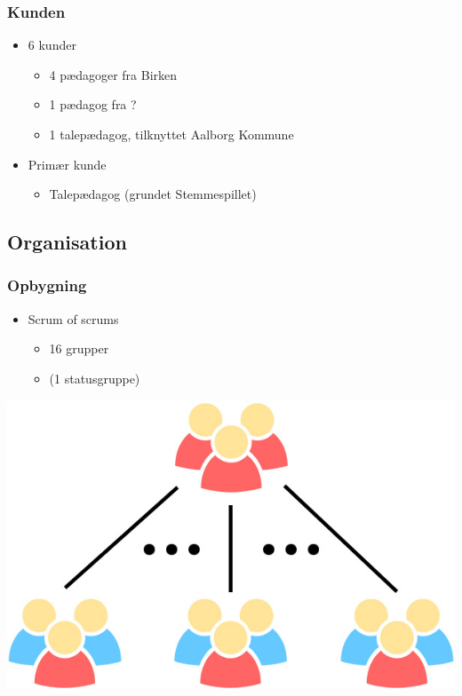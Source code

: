 \begin{frame}
\frametitle{Kunden}

\begin{itemize}
\item 6 kunder
\begin{itemize}
\item 4 pædagoger fra Birken
\item 1 pædagog fra ?
\item 1 talepædagog, tilknyttet Aalborg Kommune
\end{itemize}
\item Primær kunde
\begin{itemize}
\item Talepædagog (grundet Stemmespillet)
\end{itemize}
\end{itemize}

\end{frame}

\subsection{Organisation}

\begin{frame}
\frametitle{Opbygning}

\begin{itemize}
\item Scrum of scrums
\begin{itemize}
\item 16 grupper
\item (1 statusgruppe)
\end{itemize}
\end{itemize}

\centering\includegraphics[height=.5\textheight]{pgraphics/scrum-of-scrums}

\end{frame}

